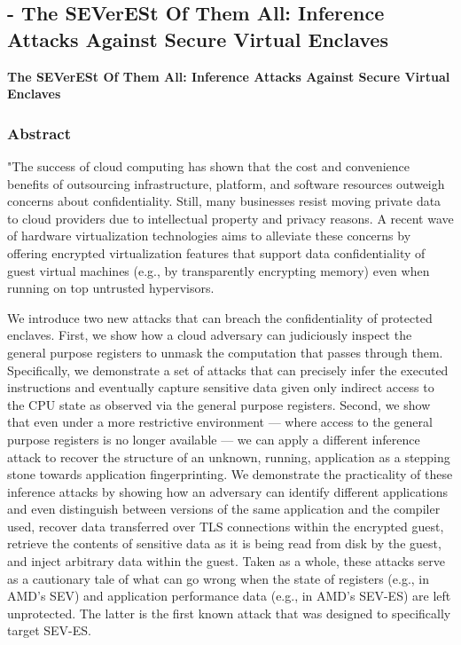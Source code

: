 
\subsection{\cite{2019-werner} - The SEVerESt Of Them All: Inference Attacks Against Secure Virtual Enclaves}

\textbf{The SEVerESt Of Them All: Inference Attacks Against Secure Virtual Enclaves}


\subsubsection*{Abstract \cite{2019-werner}}
"The success of cloud computing has shown that the cost and convenience benefits of outsourcing infrastructure, platform, and software resources outweigh concerns about confidentiality. Still, many
businesses resist moving private data to cloud providers due to intellectual property and privacy reasons. A recent wave of hardware
virtualization technologies aims to alleviate these concerns by offering encrypted virtualization features that support data confidentiality of guest virtual machines (e.g., by transparently encrypting
memory) even when running on top untrusted hypervisors.

We introduce two new attacks that can breach the confidentiality
of protected enclaves. First, we show how a cloud adversary can
judiciously inspect the general purpose registers to unmask the
computation that passes through them. Specifically, we demonstrate
a set of attacks that can precisely infer the executed instructions
and eventually capture sensitive data given only indirect access to
the CPU state as observed via the general purpose registers. Second,
we show that even under a more restrictive environment — where
access to the general purpose registers is no longer available —
we can apply a different inference attack to recover the structure
of an unknown, running, application as a stepping stone towards
application fingerprinting. We demonstrate the practicality of these
inference attacks by showing how an adversary can identify different applications and even distinguish between versions of the same
application and the compiler used, recover data transferred over
TLS connections within the encrypted guest, retrieve the contents
of sensitive data as it is being read from disk by the guest, and inject
arbitrary data within the guest. Taken as a whole, these attacks
serve as a cautionary tale of what can go wrong when the state of
registers (e.g., in AMD’s SEV) and application performance data
(e.g., in AMD’s SEV-ES) are left unprotected. The latter is the first
known attack that was designed to specifically target SEV-ES.


